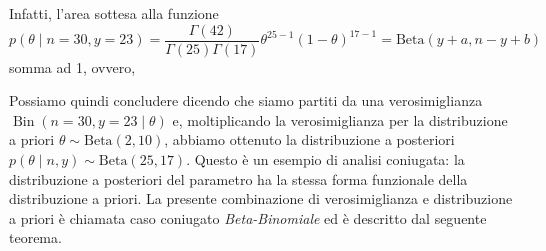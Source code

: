 \documentclass[
  11pt,
  italian,
  a4paper,
  extrafontsizes,onecolumn,openright
  ]{memoir}
\newenvironment{Shaded}{\begin{snugshade}}{\end{snugshade}}
\newcommand{\AttributeTok}[1]{\textcolor[rgb]{0.77,0.63,0.00}{#1}}
\newcommand{\CommentTok}[1]{\textcolor[rgb]{0.56,0.35,0.01}{\textit{#1}}}
\newcommand{\ControlFlowTok}[1]{\textcolor[rgb]{0.13,0.29,0.53}{\textbf{#1}}}
\newcommand{\DecValTok}[1]{\textcolor[rgb]{0.00,0.00,0.81}{#1}}
\newcommand{\FunctionTok}[1]{\textcolor[rgb]{0.00,0.00,0.00}{#1}}
\newcommand{\NormalTok}[1]{#1}
\newcommand{\OtherTok}[1]{\textcolor[rgb]{0.56,0.35,0.01}{#1}}
\newcommand{\SpecialCharTok}[1]{\textcolor[rgb]{0.00,0.00,0.00}{#1}}
\DeclareMathOperator{\Bin}{Bin} %
\theoremstyle{definition}
\theoremstyle{definition}
\theoremstyle{definition}
\theoremstyle{definition}
\theoremstyle{remark}
\begin{document}
\begin{Shaded}
\end{Shaded}

\noindent
Infatti, l'area sottesa alla funzione
\[
p(\theta \mid n=30, y=23) =  \frac{\Gamma(42)}{\Gamma(25)\Gamma(17)}\theta^{25-1}(1-\theta)^{17-1} = \text{Beta}(y+a, n-y+b)
\]
\noindent
somma ad 1, ovvero,

\begin{Shaded}
\end{Shaded}

Possiamo quindi concludere dicendo che siamo partiti da una verosimiglianza \(\Bin(n = 30, y = 23 \mid \theta)\) e, moltiplicando la verosimiglianza per la distribuzione a priori \(\theta \sim \text{Beta}(2, 10)\), abbiamo ottenuto la distribuzione a posteriori \(p(\theta \mid n, y) \sim \text{Beta}(25, 17)\). Questo è un esempio di analisi coniugata: la distribuzione a posteriori del parametro ha la stessa forma funzionale della distribuzione a priori. La presente combinazione di verosimiglianza e distribuzione a priori è chiamata caso coniugato \emph{Beta-Binomiale} ed è descritto dal seguente teorema.
\end{document}
